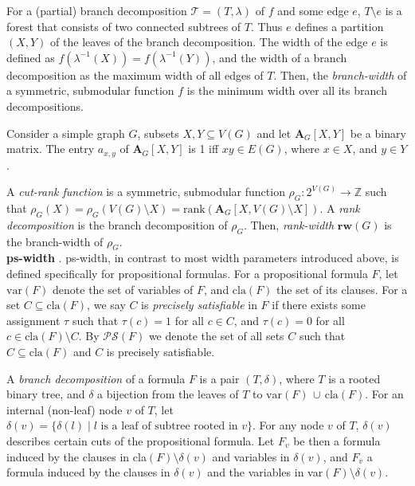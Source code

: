 For a (partial) branch decomposition $\mathcal{T} = (T,\lambda)$ of $f$ and some edge $e$, $T \setminus e$ is a forest that consists of two connected subtrees of $T$.
Thus $e$ defines a partition $(X,Y)$ of the leaves of the branch decomposition.
The width of the edge $e$ is defined as $f(\lambda^{-1}(X)) = f(\lambda^{-1}(Y))$, and the width of a branch decomposition as the maximum width of all edges of $T$.
Then, the {\em branch-width} of a symmetric, submodular function $f$ is the minimum width over all its branch decompositions.

Consider a simple graph $G$, subsets $X,Y \subseteq V(G)$ and let $\mathbf{A}_G[X,Y]$ be a binary matrix.
The entry $a_{x,y}$ of $\mathbf{A}_G[X,Y]$ is 1 iff $xy \in E(G)$, where $x\in X$, and $y\in Y$.

A {\em cut-rank function} is a symmetric, submodular function $\rho_G : 2^{V(G)} \rightarrow \mathbb{Z}$ such that $\rho_G(X)=\rho_G(V(G)\setminus X) = \text{rank}(\mathbf{A}_G[X, V(G)\setminus X])$.
A {\em rank decomposition} is the branch decomposition of $\rho_G$.
Then, {\em rank-width} $\textbf{rw}(G)$ is the branch-width of $\rho_G$. \\


\noindent
\textbf{ps-width} \cite{DBLP:conf/sat/SaetherTV14}.
ps-width, in contrast to most width parameters introduced above, is defined specifically for propositional formulas.
For a propositional formula $F$, let $\text{var}(F)$ denote the set of variables of $F$, and $\text{cla}(F)$ the set of its clauses.
For a set $C \subseteq \text{cla}(F)$, we say $C$ is {\em precisely satisfiable} in $F$ if there exists some assignment $\tau$ such that $\tau(c)=1$ for all $c\in C$, and $\tau(c)=0$ for all $c \in \text{cla}(F)\setminus C$.
By $\mathcal{PS}(F)$ we denote the set of all sets $C$ such that $C \subseteq \text{cla}(F)$ and $C$ is precisely satisfiable.


A {\em branch decomposition} of a formula $F$ is a pair $(T, \delta)$, where $T$ is a rooted binary tree, and $\delta$ a bijection from the leaves of $T$ to $\text{var}(F) \, \cup \, \text{cla}(F)$.
For an internal (non-leaf) node $v$ of $T$, let $\delta(v) = \{ \delta(l) \; | \; l \text{ is a leaf of subtree rooted in } v \}$.
For any node $v$ of $T$, $\delta(v)$ describes certain cuts of the propositional formula.
Let $F_v$ be then a formula induced by the clauses in cla$(F)\setminus \delta(v)$ and variables in $\delta(v)$, and $F_{\overline{v}}$ a formula induced by the clauses in $\delta(v)$ and the variables in var$(F)\setminus \delta(v)$.

